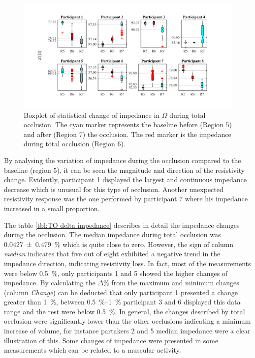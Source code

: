 \begin{figure}[htpb]
	\centering
	\includegraphics[width=15cm,keepaspectratio]{figure_vop_7}    
	\caption[Change of impedance during total occlusion]{Boxplot of statistical change of impedance in $\Omega$ during total occlusion. The cyan marker represents the baseline before (Region 5) and after (Region 7) the occlusion. The red marker is the impedance during total occlusion (Region 6).}
	\label{fig:total arterial statistics impedance}
\end{figure} 

By analysing the variation of impedance during the occlusion compared to the baseline (region 5), it can be seen the magnitude and direction of the resistivity change. Evidently, participant 1 displayed the largest and continuous impedance decrease which is unusual for this type of occlusion. Another unexpected resistivity response was the one performed by participant 7 where his impedance increased in a small proportion.  

The table \ref{tbl:TO delta impedance} describes in detail the impedance changes during the occlusion. The median impedance during total occlusion was \SI{0.0427(04790)}{\percent} which is quite close to zero. However, the sign of column \textit{median} indicates that five out of eight exhibited a negative trend in the impedance direction, indicating resistivity loss. In fact, most of the measurements were below \SI{0.5}{\percent}, only participants 1 and 5 showed the higher changes of impedance. By calculating the $\Delta \%$  from the maximum and minimum changes (column \textit{Change}) can be deducted that only participant 1 presented a change greater than \SI{1}{\percent}, between \SIrange{0.5}{1}{\percent} participant 3 and 6 displayed this data range and the rest were below \SI{0.5}{\percent}. In general, the changes described by total occlusion were significantly lower than the other occlusions indicating a minimum increase of volume, for instance partakers 2 and 5 median impedance were a clear illustration of this. Some changes of impedance were presented in some measurements which can be related to a muscular activity. 

